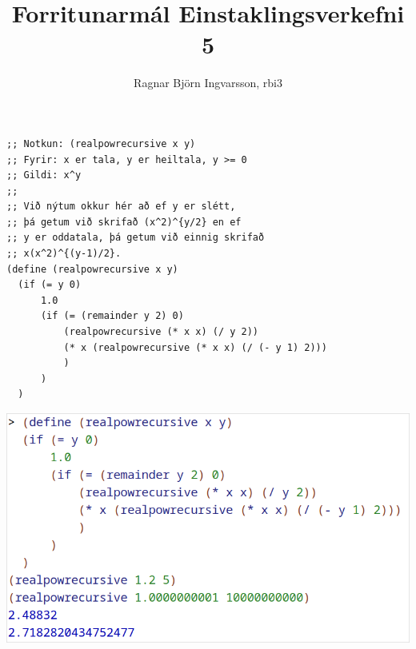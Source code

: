 \documentclass{article}
\title{Forritunarmál Einstaklingsverkefni 5}
\author{Ragnar Björn Ingvarsson, rbi3}
\begin{document}
\renewcommand\thepage{}
	
	\maketitle

	\newpage
	\setcounter{page}{1}
	\renewcommand\thepage{\arabic{page}}

	\section{}
	\begin{verbatim}
;; Notkun: (realpowrecursive x y)
;; Fyrir: x er tala, y er heiltala, y >= 0
;; Gildi: x^y
;;
;; Við nýtum okkur hér að ef y er slétt,
;; þá getum við skrifað (x^2)^{y/2} en ef
;; y er oddatala, þá getum við einnig skrifað
;; x(x^2)^{(y-1)/2}.
(define (realpowrecursive x y)
  (if (= y 0)
      1.0
      (if (= (remainder y 2) 0)
          (realpowrecursive (* x x) (/ y 2))
          (* x (realpowrecursive (* x x) (/ (- y 1) 2)))
          )
      )
  )
	\end{verbatim}
	\begin{center}
		\includegraphics[scale=0.35]{realpow.png}
	\end{center}

	\newpage
\end{document}
